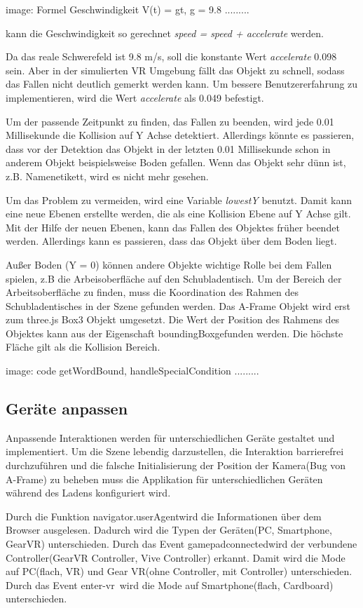   image: Formel Geschwindigkeit V(t) = gt, g = 9.8 .........
  
  kann die Geschwindigkeit so gerechnet \textit{speed = speed + accelerate} werden. 
  
  Da das reale Schwerefeld ist 9.8 m/s, soll die konstante Wert \textit{accelerate} 0.098 sein. Aber in der simulierten VR Umgebung fällt das Objekt zu schnell, sodass das Fallen nicht deutlich gemerkt werden kann. Um bessere Benutzererfahrung zu implementieren, wird die Wert \textit{accelerate} als 0.049 befestigt.
  
  Um der passende Zeitpunkt zu finden, das Fallen zu beenden, wird jede 0.01 Millisekunde die Kollision auf Y Achse detektiert. Allerdings könnte es passieren, dass vor der Detektion das Objekt in der letzten 0.01 Millisekunde schon in anderem Objekt beispielsweise Boden gefallen. Wenn das Objekt sehr dünn ist, z.B. Namenetikett, wird es nicht mehr gesehen.
  
  Um das Problem zu vermeiden, wird eine Variable \textit{lowestY} benutzt. Damit kann eine neue Ebenen erstellte werden, die als eine Kollision Ebene auf Y Achse gilt. Mit der Hilfe der neuen Ebenen, kann das Fallen des Objektes früher beendet werden. Allerdings kann es passieren, dass das Objekt über dem Boden liegt.
  
  Außer Boden (Y = 0) können andere Objekte wichtige Rolle bei dem Fallen spielen, z.B die Arbeisoberfläche auf den Schubladentisch. Um der Bereich der Arbeitsoberfläche zu finden, muss die Koordination des Rahmen des Schubladentisches in der Szene gefunden werden. Das A-Frame Objekt wird erst zum three.js Box3 Objekt umgesetzt. Die Wert der Position des Rahmens des Objektes kann aus der Eigenschaft \glqq boundingBox\grqq gefunden werden. Die höchste Fläche gilt als die Kollision Bereich.
  
  image: code getWordBound, handleSpecialCondition .........
  
 \subsection{Geräte anpassen}
 Anpassende Interaktionen werden für unterschiedlichen Geräte gestaltet und implementiert. Um die Szene lebendig darzustellen, die Interaktion barrierefrei durchzuführen und die falsche Initialisierung der Position der Kamera(Bug von A-Frame) zu beheben muss die Applikation für unterschiedlichen Geräten während des Ladens konfiguriert wird.
 
 Durch die Funktion \glqq navigator.userAgent\grqq wird die Informationen über dem Browser ausgelesen. Dadurch wird die Typen der Geräten(PC, Smartphone, GearVR) unterschieden. Durch das Event \glqq gamepadconnected\grqq wird der verbundene Controller(GearVR Controller, Vive Controller) erkannt. Damit wird die Mode auf PC(flach, VR) und Gear VR(ohne Controller, mit Controller) unterschieden. Durch das Event \glqq enter-vr\grqq\ wird die Mode auf Smartphone(flach, Cardboard) unterschieden.
 
